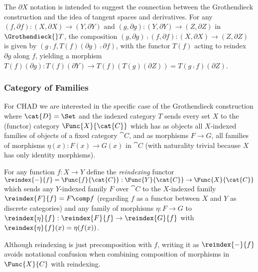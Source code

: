 \noindent The $\partial X$ notation is intended to suggest the connection between the Grothendieck
construction and the idea of tangent spaces and derivatives. For any $(f, \partial f): (X, \partial X) \to (Y,
\partial Y)$ and $(g, \partial g): (Y, \partial Y) \to (Z, \partial Z)$ in $\Grothendieck{}T$, the composition
$(g, \partial g) \comp (f, \partial f): (X, \partial X) \to (Z, \partial Z)$ is given by $(g \comp f,
T(f)(\partial g) \comp \partial f)$, with the functor $T(f)$ acting to reindex $\partial g$ along $f$,
yielding a morphism $T(f)(\partial g): T(f)(\partial Y) \to T(f)(T(g)(\partial Z)) = T(g \comp f)(\partial
Z)$.

\subsubsection{Category of Families}
\label{sec:Fam}

For CHAD we are interested in the specific case of the Grothendieck construction where $\cat{D} = \Set$ and
the indexed category $T$ sends every set $X$ to the (functor) category $\Func{X}{\cat{C}}$ which has as
objects all $X$-indexed families of objects of a fixed category $\cat{C}$, and as morphisms $F \to G$, all
families of morphisms $\eta(x): F(x) \to G(x)$ in $\cat{C}$ (with naturality trivial because $X$ has only
identity morphisms).

%

\begin{definition}[Reindexing]
For any function $f: X \to Y$ define the \emph{reindexing} functor $\reindex{-}{f} = \Func{f}{\cat{C}}:
\Func{Y}{\cat{C}} \to \Func{X}{\cat{C}}$ which sends any $Y$-indexed family $F$ over $\cat{C}$ to the
$X$-indexed family $\reindex{F}{f} = F \comp f$ (regarding $f$ as a functor between $X$ and $Y$ as discrete
categories) and any family of morphisms $\eta: F \to G$ to $\reindex{\eta}{f}: \reindex{F}{f} \to
\reindex{G}{f}$ with $\reindex{\eta}{f}(x) = \eta(f(x))$.
\end{definition}

\noindent Although reindexing is just precomposition with $f$, writing it as $\reindex{-}{f}$ avoids
notational confusion when combining composition of morphisms in $\Func{X}{C}$ with reindexing.


